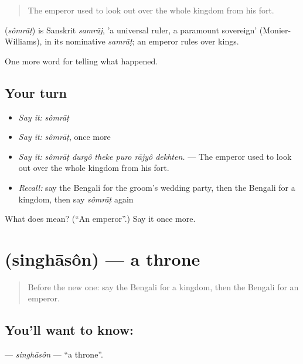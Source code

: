 \begin{quote}
The emperor used to look out over the whole kingdom from his fort.
\end{quote}

\begin{cousinweb}
\textbf{} (\emph{sômrāṭ}) is Sanskrit \emph{samrāj}, 'a universal ruler, a paramount sovereign' (Monier-Williams), in its nominative \emph{samrāṭ}; an emperor rules over kings.
\end{cousinweb}

\begin{grammarlens}[title={What you've built}]
One more word for telling what happened.
\end{grammarlens}

\subsection*{Your turn}
\begin{itemize}
\raggedright
  \item \emph{Say it:} \emph{sômrāṭ}
  \item \emph{Say it:} \emph{sômrāṭ}, once more
  \item \emph{Say it:} \emph{sômrāṭ durgô theke puro rājyô dekhten.} — The emperor used to look out over the whole kingdom from his fort.
  \item \emph{Recall:} say the Bengali for the groom's wedding party, then the Bengali for a kingdom, then say \emph{sômrāṭ} again
\end{itemize}

\begin{tcolorbox}[breakable,colback=teal!4,colframe=teal!35!black,title={Before you move on}]
What does  mean? (\textquotedblleft{}An emperor\textquotedblright{}.) Say it once more.
\end{tcolorbox}
\section[\texorpdfstring{\bn{সিংহাসন} (singhāsôn)}{সিংহাসন (singhāsôn)}]{ (singhāsôn) — a throne}

\label{lesson:BN-C313-singhason}



\begin{quote}
Before the new one: say the Bengali for a kingdom, then the Bengali for an emperor.
\end{quote}

\subsection*{You'll want to know: }
\textbf{} — \emph{singhāsôn} — \textquotedblleft{}a throne\textquotedblright{}.

